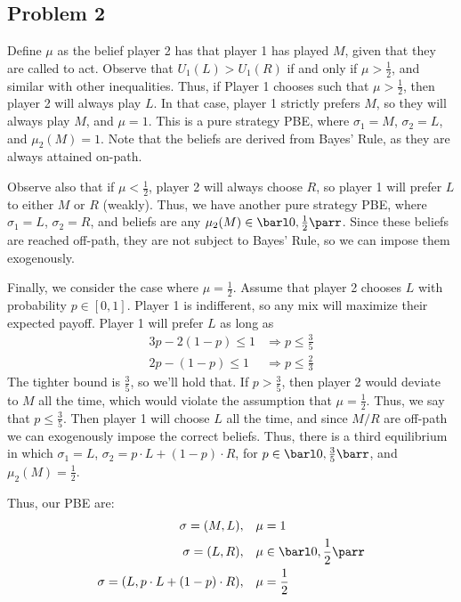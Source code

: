 \documentclass[10pt]{article}
\begin{document}
\subsection*{Problem 2}

Define $\mu$ as the belief player 2 has that player 1 has played $M$, given that they are called to act. Observe that $U_1(L) > U_1(R)$ if and only if $\mu > \frac{1}{2}$, and similar with other inequalities. Thus, if Player 1 chooses such that $\mu > \frac{1}{2}$, then player 2 will always play $L$. In that case, player 1 strictly prefers $M$, so they will always play $M$, and $\mu = 1$. This is a pure strategy PBE, where $\sigma_1 = M$, $\sigma_2 = L$, and $\mu_2(M) = 1$. Note that the beliefs are derived from Bayes' Rule, as they are always attained on-path.

Observe also that if $\mu < \frac{1}{2}$, player 2 will always choose $R$, so player 1 will prefer $L$ to either $M$ or $R$ (weakly). Thus, we have another pure strategy PBE, where $\sigma_1 = L$, $\sigma_2 = R$, and beliefs are any $\mu_2(M) \in \barl 0,\frac{1}{2}\parr$. Since these beliefs are reached off-path, they are not subject to Bayes' Rule, so we can impose them exogenously.

Finally, we consider the case where $\mu = \frac{1}{2}$. Assume that player 2 chooses $L$ with probability $p \in [0,1]$. Player 1 is indifferent, so any mix will maximize their expected payoff. Player 1 will prefer $L$ as long as \begin{align*} 3p - 2(1-p) \le 1 &\Longrightarrow p \le \frac{3}{5} \\ 2p - (1-p) \le 1 &\Longrightarrow p \le \frac{2}{3}\end{align*}The tighter bound is $\frac{3}{5}$, so we'll hold that. If $p > \frac{3}{5}$, then player 2 would deviate to $M$ all the time, which would violate the assumption that $\mu = \frac{1}{2}$. Thus, we say that $p \le \frac{3}{5}$. Then player 1 will choose $L$ all the time, and since $M/R$ are off-path we can exogenously impose the correct beliefs. Thus, there is a third equilibrium in which $\sigma_1 = L$, $\sigma_2 =p \cdot L + (1-p)\cdot R$, for $p \in \barl 0,\frac{3}{5}\barr $, and $\mu_2(M) = \frac{1}{2}$. 

Thus, our PBE are:
\begin{align*}
	\sigma = (M, L),&\quad \mu = 1 \\\sigma = (L,R),&\quad \mu \in \barl 0 ,\frac{1}{2}\parr \\ \sigma = (L,p\cdot L + (1-p)\cdot R),&\quad \mu = \frac{1}{2}
\end{align*}
\end{document}
